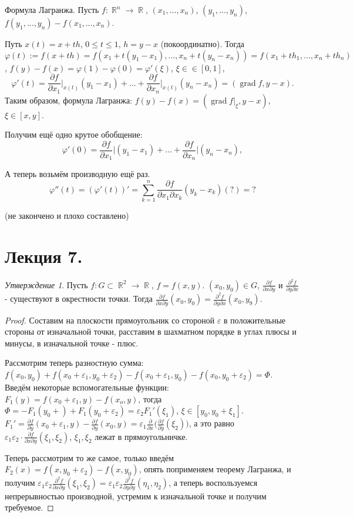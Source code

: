 \documentclass[a4paper,100pt]{article}
\theoremstyle{indented}
\theoremstyle{definition}
\theoremstyle{remark}
\newtheorem{stat}{Утверждение}
\DeclareMathOperator{\RR}{\mathbb{R}}
\DeclareMathOperator{\grad}{grad}
\begin{document}
Формула Лагранжа. Пусть $f:\RR^n\rightarrow \RR$, $(x_1, \ldots, x_n)$, $(y_1, \ldots, y_n)$, $f(y_1, \ldots, y_n)- f(x_1, \ldots, x_n)$. \ 

Путь $x(t)= x+th$, $0\leq t\leq 1$, $h=y-x$ (покоординатно). Тогда $\varphi(t) := f(x+th)=f(x_1+t(y_1-x_1), \ldots, x_n+t(y_n-x_n))= f(x_1+th_1, \ldots, x_n+th_n)$, $f(y)-f(x)= \varphi(1)-\varphi(0)= \varphi'(\xi)$, $\xi\in\in[0, 1]$, 
\[
    \varphi'(t)= \frac{\partial f}{\partial x_1}\bigg|_{x(t)}(y_1-x_1)+\ldots+\frac{\partial f}{\partial x_n}\bigg|_{x(t)}(y_n-x_n)= (\grad f, y-x). 
\]
Таким образом, формула Лагранжа: $f(y)-f(x)=(\grad f|_\xi, y-x)$, $\xi\in[x, y]$. \ 

Получим ещё одно крутое обобщение:
\[
    \varphi'(0)=\frac{\partial f}{\partial x_1}\bigg| (y_1-x_1)+\ldots +\frac{\partial f}{\partial x_n}\bigg|(y_n-x_n), 
\]

А теперь возьмём производную ещё раз. 
\[
    \varphi''(t)= (\varphi'(t))'= \sum_{k=1}^n\frac{\partial f}{\partial x_1 \partial x_k}(y_k-x_k)(?)=?
\]

(не закончено и плохо составлено)

\section{Лекция 7.}

\begin{stat}
    Пусть $f:G\subset \RR^2\rightarrow \RR$, $f=f(x, y)$. $(x_0, y_0)\in G$, $\frac{\partial f}{\partial x \partial y}$ и $\frac{\partial^2 f}{\partial y \partial x}$ - существуют в окрестности точки. Тогда $\frac{\partial f}{\partial x \partial y}(x_0, y_0)=\frac{\partial^2 f}{\partial y \partial x}(x_0, y_9)$. 
\end{stat}

\begin{proof}
    Составим на плоскости прямоугольник со стороной $\varepsilon $ в положительные стороны от изначальной точки, расставим в шахматном порядке в углах плюсы и минусы, в изначальной точке - плюс. \ 

    Рассмотрим теперь разностную сумма: $f(x_0, y_0)+f(x_0+\varepsilon_1, y_0+\varepsilon_2)-f(x_0+\varepsilon_1, y_0)- f(x_0, y_0+\varepsilon_2)= \Phi$. Введём некоторые вспомогательные функции: $F_1(y)=f(x_0+\varepsilon_1, y)-f(x_o, y)$, тогда $\Phi=-F_1(y_0+)+F_1(y_0+\varepsilon_2)= \varepsilon_2F_1'(\xi_1)$, $\xi\in[y_0, y_0+\xi_1]$. $F_1'=\frac{\partial f}{\partial y}(x_0+\varepsilon_1, y)-\frac{\partial f}{\partial y}(x_0, y)= \varepsilon_1\frac{\partial}{\partial x}\biggl(\frac{\partial f}{\partial y}(\xi_2)\biggr)$, а это равно $\varepsilon_1\varepsilon_2\cdot\frac{\partial f}{\partial x\partial y}(\xi_1, \xi_2)$, $\xi_1, \xi_2$ лежат в прямоугольничке. \ 

    Теперь рассмотрим то же самое, только введём $F_2(x)=f(x, y_0+\varepsilon_2)-f(x, y_0)$, опять поприменяем теорему Лагранжа, и получим $\varepsilon_1\varepsilon_2\frac{\partial^2 f}{\partial x \partial y}(\xi_1, \xi_2)=\varepsilon_1\varepsilon_2\frac{\partial^2 f}{\partial y \partial y}(\eta_1, \eta_2)$, а теперь воспользуемся непрерывностью производной, устремим к изначальной точке и получим требуемое.
\end{proof}
\end{document}

